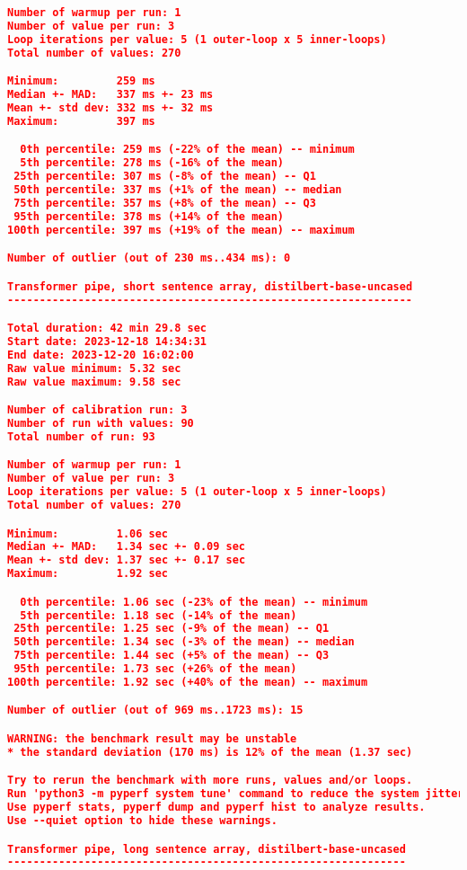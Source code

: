\begin{lstlisting}[language=json]
Number of warmup per run: 1
Number of value per run: 3
Loop iterations per value: 5 (1 outer-loop x 5 inner-loops)
Total number of values: 270

Minimum:         259 ms
Median +- MAD:   337 ms +- 23 ms
Mean +- std dev: 332 ms +- 32 ms
Maximum:         397 ms

  0th percentile: 259 ms (-22% of the mean) -- minimum
  5th percentile: 278 ms (-16% of the mean)
 25th percentile: 307 ms (-8% of the mean) -- Q1
 50th percentile: 337 ms (+1% of the mean) -- median
 75th percentile: 357 ms (+8% of the mean) -- Q3
 95th percentile: 378 ms (+14% of the mean)
100th percentile: 397 ms (+19% of the mean) -- maximum

Number of outlier (out of 230 ms..434 ms): 0

Transformer pipe, short sentence array, distilbert-base-uncased
---------------------------------------------------------------

Total duration: 42 min 29.8 sec
Start date: 2023-12-18 14:34:31
End date: 2023-12-20 16:02:00
Raw value minimum: 5.32 sec
Raw value maximum: 9.58 sec

Number of calibration run: 3
Number of run with values: 90
Total number of run: 93

Number of warmup per run: 1
Number of value per run: 3
Loop iterations per value: 5 (1 outer-loop x 5 inner-loops)
Total number of values: 270

Minimum:         1.06 sec
Median +- MAD:   1.34 sec +- 0.09 sec
Mean +- std dev: 1.37 sec +- 0.17 sec
Maximum:         1.92 sec

  0th percentile: 1.06 sec (-23% of the mean) -- minimum
  5th percentile: 1.18 sec (-14% of the mean)
 25th percentile: 1.25 sec (-9% of the mean) -- Q1
 50th percentile: 1.34 sec (-3% of the mean) -- median
 75th percentile: 1.44 sec (+5% of the mean) -- Q3
 95th percentile: 1.73 sec (+26% of the mean)
100th percentile: 1.92 sec (+40% of the mean) -- maximum

Number of outlier (out of 969 ms..1723 ms): 15

WARNING: the benchmark result may be unstable
* the standard deviation (170 ms) is 12% of the mean (1.37 sec)

Try to rerun the benchmark with more runs, values and/or loops.
Run 'python3 -m pyperf system tune' command to reduce the system jitter.
Use pyperf stats, pyperf dump and pyperf hist to analyze results.
Use --quiet option to hide these warnings.

Transformer pipe, long sentence array, distilbert-base-uncased
--------------------------------------------------------------


\end{lstlisting}
